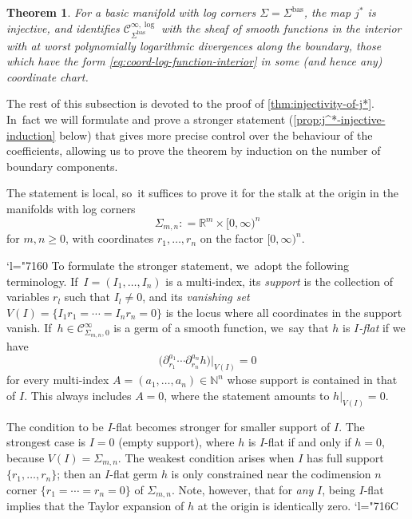 \documentclass[JEP,XML,SOM,Unicode,NoFloatCountersInSection,published]{cedram}
\newcommand{\Changel}{\mathcode`l="7160}
\newcommand{\Changelback}{\mathcode`l="716C}
\newtheorem{theorem}{Theorem}[section]
\theoremstyle{definition}
\theoremstyle{remark}
\let\defn\emph
\newcommand{\RR}{\mathbb{R}}
\newcommand{\NN}{\mathbb{N}}
\newcommand{\halfspc}[1]{[0,\infty)^{#1}}
\renewcommand{\ge}{\geqslant}
\newcommand{\defas}{\mathrel{\mathop:}=}
\newcommand{\Cinf}[1]{\mathscr{C}^{\infty}_{#1}}
\newcommand{\Cinflog}[1]{\mathscr{C}^{\infty,\log}_{#1}}
\newcommand{\cvf}[1]{\partial_{#1}}
\newcommand{\Sig}{\Sigma}
\newcommand{\bas}[1]{{#1}^{\mathrm{bas}}}
\newcommand{\Sigbas}{\bas{\Sig}}
\begin{document}
\begin{theorem}\label{thm:injectivity-of-j*}
For a basic manifold with log corners $\Sig = \Sigbas$, the map $j^*$ is injective, and identifies $\Cinflog{\Sigbas}$ with the sheaf of smooth functions in the interior with at worst polynomially logarithmic divergences along the boundary, \ie those which have the form \eqref{eq:coord-log-function-interior} in some (and hence any) coordinate chart.
\end{theorem}

The rest of this subsection is devoted to the proof of \autoref{thm:injectivity-of-j*}. In~fact we will formulate and prove a stronger statement (\autoref{prop:j^*-injective-induction} below) that gives more precise control over the behaviour of the coefficients, allowing us to prove the theorem by induction on the number of boundary components.

The statement is local, so~it suffices to prove it for the stalk at the origin in the manifolds with log corners
\begin{equation*}
\Sig_{m,n} \defas \RR^m \times [0,\infty)^n
\end{equation*}
for $m,n \ge 0$, with coordinates $r_1,\ldots,r_n$ on the factor $\halfspc{n}$.

\Changel{}
To formulate the stronger statement, we~adopt the following terminology. If~$I = (I_1,\ldots,I_n)$ is a multi-index, its \defn{support} is the collection of variables $r_l$ such that $I_l\neq 0$, and its \defn{vanishing set} $V(I)=\{I_1 r_1=\cdots=I_n r_n=0\}$ is the locus where all coordinates in the support vanish. If~$h \in \Cinf{\Sig_{m,n},0}$ is a germ of a smooth function, we~say that $h$ is \defn{$I$\nobreakdash-flat} if we have
\begin{equation*}
\big(\cvf{r_1}^{a_1}\cdots \cvf{r_n}^{a_n} h \big)\Big|_{V(I)} = 0
\end{equation*}
for every multi-index $A = (a_1,\ldots,a_n)\in\NN^n$ whose support is contained in that of $I$. This always includes $A =0$, where the statement amounts to $h|_{V(I)} = 0$.

The condition to be $I$\nobreakdash-flat becomes stronger for smaller support of $I$. The strongest case is $I=0$ (empty support), where $h$ is $I$\nobreakdash-flat if and only if $h=0$, because $V(I)=\Sig_{m,n}$. The weakest condition arises when $I$ has full support $\{r_1,\ldots,r_n\}$; then an $I$\nobreakdash-flat germ $h$ is only constrained near the codimension $n$ corner $\{r_1=\cdots=r_n=0\}$ of $\Sig_{m,n}$. Note, however, that for \emph{any} $I$, being $I$\nobreakdash-flat implies that the Taylor expansion of $h$ at the origin is identically zero.
\Changelback
\end{document}
